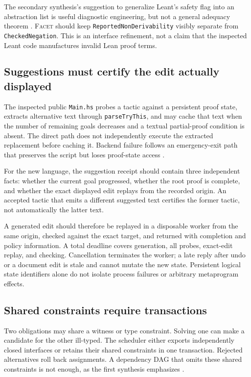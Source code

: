 \documentclass[11pt,letterpaper]{article}
\newcommand{\code}[1]{\nolinkurl{#1}}
\newcommand{\Facet}{\textsc{Facet}}
\numberwithin{equation}{section}
\begin{document}
The secondary synthesis's suggestion to generalize Leant's safety flag into an
abstraction list is useful diagnostic engineering, but not a general adequacy
theorem \cite{blueprints,l-engine}. \Facet{} should keep
\code{ReportedNonDerivability} visibly separate from \code{CheckedNegation}.
This is an interface refinement, not a claim that the inspected Leant code
manufactures invalid Lean proof terms.

\subsection{Suggestions must certify the edit actually displayed}
The inspected public \code{Main.hs} probes a tactic against a persistent proof
state, extracts alternative text through \code{parseTryThis}, and may cache that
text when the number of remaining goals decreases and a textual partial-proof
condition is absent. The direct path does not independently execute the extracted
replacement before caching it. Backend failure follows an emergency-exit path
that preserves the script but loses proof-state access \cite{l-main}.

For the new language, the suggestion receipt should contain three independent
facts: whether the current goal progressed, whether the root proof is complete,
and whether the exact displayed edit replays from the recorded origin. An
accepted tactic that emits a different suggested text certifies the former tactic,
not automatically the latter text.

A generated edit should therefore be replayed in a disposable worker from the
same origin, checked against the exact target, and returned with completion and
policy information. A total deadline covers generation, all probes, exact-edit
replay, and checking. Cancellation terminates the worker; a late reply after
undo or a document edit is stale and cannot mutate the new state. Persistent
logical state identifiers alone do not isolate process failures or arbitrary
metaprogram effects.

\subsection{Shared constraints require transactions}
Two obligations may share a witness or type constraint. Solving one can make a
candidate for the other ill-typed. The scheduler either exports independently
closed interfaces or retains their shared constraints in one transaction.
Rejected alternatives roll back assignments. A dependency DAG that omits these
shared constraints is not enough, as the first synthesis emphasizes
\cite{synthesis}.
\end{document}
